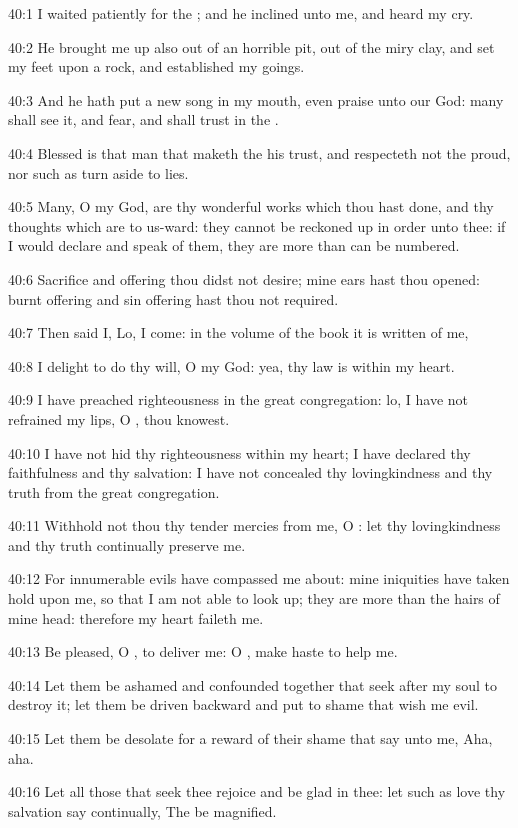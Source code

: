 40:1 I waited patiently for the \LORD; and he inclined unto me, and heard my cry.

40:2 He brought me up also out of an horrible pit, out of the miry clay, and set my feet upon a rock, and established my goings.

40:3 And he hath put a new song in my mouth, even praise unto our God: many shall see it, and fear, and shall trust in the \LORD.

40:4 Blessed is that man that maketh the \LORD his trust, and respecteth not the proud, nor such as turn aside to lies.

40:5 Many, O \LORD my God, are thy wonderful works which thou hast done, and thy thoughts which are to us-ward: they cannot be reckoned up in order unto thee: if I would declare and speak of them, they are more than can be numbered.

40:6 Sacrifice and offering thou didst not desire; mine ears hast thou opened: burnt offering and sin offering hast thou not required.

40:7 Then said I, Lo, I come: in the volume of the book it is written of me,

40:8 I delight to do thy will, O my God: yea, thy law is within my heart.

40:9 I have preached righteousness in the great congregation: lo, I have not refrained my lips, O \LORD, thou knowest.

40:10 I have not hid thy righteousness within my heart; I have declared thy faithfulness and thy salvation: I have not concealed thy lovingkindness and thy truth from the great congregation.

40:11 Withhold not thou thy tender mercies from me, O \LORD: let thy lovingkindness and thy truth continually preserve me.

40:12 For innumerable evils have compassed me about: mine iniquities have taken hold upon me, so that I am not able to look up; they are more than the hairs of mine head: therefore my heart faileth me.

40:13 Be pleased, O \LORD, to deliver me: O \LORD, make haste to help me.

40:14 Let them be ashamed and confounded together that seek after my soul to destroy it; let them be driven backward and put to shame that wish me evil.

40:15 Let them be desolate for a reward of their shame that say unto me, Aha, aha.

40:16 Let all those that seek thee rejoice and be glad in thee: let such as love thy salvation say continually, The \LORD be magnified.

